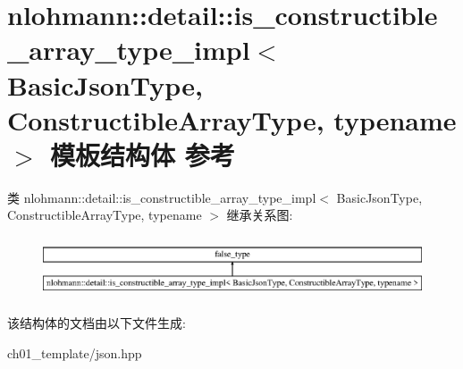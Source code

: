 \hypertarget{structnlohmann_1_1detail_1_1is__constructible__array__type__impl}{}\section{nlohmann\+::detail\+::is\+\_\+constructible\+\_\+array\+\_\+type\+\_\+impl$<$ Basic\+Json\+Type, Constructible\+Array\+Type, typename $>$ 模板结构体 参考}
\label{structnlohmann_1_1detail_1_1is__constructible__array__type__impl}
类 nlohmann\+::detail\+::is\+\_\+constructible\+\_\+array\+\_\+type\+\_\+impl$<$ Basic\+Json\+Type, Constructible\+Array\+Type, typename $>$ 继承关系图\+:\begin{figure}[H]
\begin{center}
\leavevmode
\includegraphics[height=1.809370cm]{structnlohmann_1_1detail_1_1is__constructible__array__type__impl}
\end{center}
\end{figure}


该结构体的文档由以下文件生成\+:\begin{DoxyCompactItemize}
\item 
ch01\+\_\+template/json.\+hpp\end{DoxyCompactItemize}
